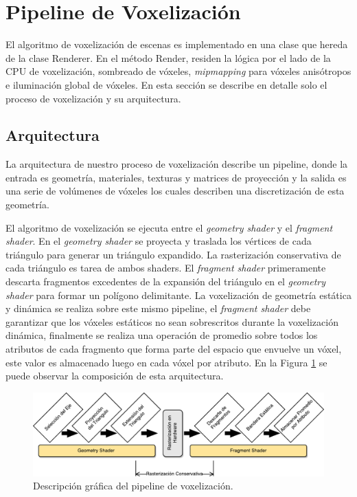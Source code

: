 \section{Pipeline de Voxelización} %
\label{sec:pipeline_de_voxelizacion}
El algoritmo de voxelización de escenas es implementado en una clase que hereda de la clase Renderer. En el método Render, residen la lógica por el lado de la CPU de voxelización, sombreado de vóxeles, \emph{mipmapping} para vóxeles anisótropos e iluminación global de vóxeles. En esta sección se describe en detalle solo el proceso de voxelización y su arquitectura.
\subsection{Arquitectura}

La arquitectura de nuestro proceso de voxelización describe un pipeline, donde la entrada es geometría, materiales, texturas y matrices de proyección y la salida es una serie de volúmenes de vóxeles los cuales describen una discretización de esta geometría.

El algoritmo de voxelización se ejecuta entre el \emph{geometry shader} y el \emph{fragment shader}. En el \emph{geometry shader} se proyecta y traslada los vértices de cada triángulo para generar un triángulo expandido. La rasterización conservativa de cada triángulo es tarea de ambos shaders. El \emph{fragment shader} primeramente descarta fragmentos excedentes de la expansión del triángulo en el \emph{geometry shader} para formar un polígono delimitante. La voxelización de geometría estática y dinámica se realiza sobre este mismo pipeline, el \emph{fragment shader} debe garantizar que los vóxeles estáticos no sean sobrescritos durante la voxelización dinámica, finalmente se realiza una operación de promedio sobre todos los atributos de cada fragmento que forma parte del espacio que envuelve un vóxel, este valor es almacenado luego en cada vóxel por atributo. En la Figura \ref{fig:voxel_pipeline_impl} se puede observar la composición de esta arquitectura.
\begin{figure}[H]
    \centering
    \includegraphics[width=\linewidth]{media/voxel_pipeline_cropped.pdf}
    \caption{Descripción gráfica del pipeline de voxelización.}
    \label{fig:voxel_pipeline_impl}
\end{figure}

